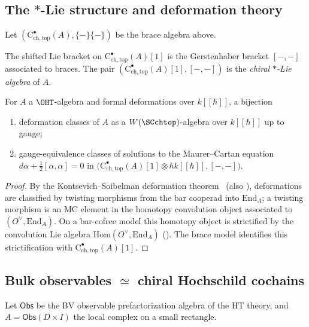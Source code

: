 \subsection{The \texorpdfstring{$\ast$}{*}-Lie structure and deformation theory}
\label{subsec:star-Lie-brace}
Let $(\mathrm{C}^\bullet_{\mathrm{ch,top}}(A),\{-\}\{-\})$ be the brace algebra above.

\begin{definition}
\label{def:star-Lie-brace}
The shifted Lie bracket on $\mathrm{C}^\bullet_{\mathrm{ch,top}}(A)[1]$ is the Gerstenhaber bracket $[-,-]$ associated to braces. The pair $(\mathrm{C}^\bullet_{\mathrm{ch,top}}(A)[1],[-,-])$ is the \emph{chiral $\ast$-Lie algebra} of $A$.
\end{definition}

\begin{theorem}
\label{thm:MC-deformations-brace}
For $A$ a $\OHT$-algebra and formal deformations over $k[\![\hbar]\!]$, a bijection
\begin{enumerate}[label=(\alph*)]
 \item deformation classes of $A$ as a $W(\SCchtop)$-algebra over $k[\![\hbar]\!]$ up to gauge;
 \item gauge-equivalence classes of solutions to the Maurer--Cartan equation
 \(
 d\alpha + \tfrac{1}{2}[\alpha,\alpha]=0
 \)
 in $\bigl(\mathrm{C}^\bullet_{\mathrm{ch,top}}(A)[1]\otimes \hbar k[\![\hbar]\!],[-,-]\bigr)$.
\end{enumerate}
\end{theorem}

\begin{proof}
By the Kontsevich--Soibelman deformation theorem~\cite[Thm.~3.1]{KS09} (also \cite[Thm.~10.3.1]{LV12}), deformations are classified by twisting morphisms from the bar cooperad into $\mathrm{End}_A$; a twisting morphism is an MC element in the homotopy convolution object associated to $(O^\vee,\mathrm{End}_A)$. On a bar-cofree model this homotopy object is strictified by the convolution Lie algebra $\mathrm{Hom}(O^\vee,\mathrm{End}_A)$ (\cite{GK94,Val07}). The brace model identifies this strictification with $\mathrm{C}^\bullet_{\mathrm{ch,top}}(A)[1]$.
\end{proof}

\subsection{Bulk observables \texorpdfstring{$\simeq$}{=} chiral Hochschild cochains}
\label{subsec:bulk-equals-CHC-brace}
Let $\mathsf{Obs}$ be the BV observable prefactorization algebra of the HT theory, and $A=\mathsf{Obs}(D\times I)$ the local complex on a small rectangle.

